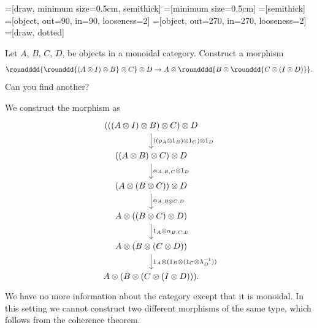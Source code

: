 \def\pathToRoot{../../}

\usetikzlibrary{fit}
\usetikzlibrary{knots}
\usetikzlibrary{hobby}
=[draw, minimum size=0.5cm, semithick]
=[minimum size=0.5cm]
=[semithick]
=[object, out=90, in=90, looseness=2]
=[object, out=270, in=270, looseness=2]
=[draw, dotted]

\graphicspath{{graphics/}}



\author{Felix Rech}


\begin{exercise}
  Let $A$, $B$, $C$, $D$, be objects in a monoidal category.
  Construct a morphism
  \[
    \roundddd{\rounddd{(A \otimes I) \otimes B} \otimes C} \otimes D
    \to A \otimes \roundddd{B \otimes \rounddd{C \otimes (I \otimes D)}}.
  \]
  Can you find another?
\end{exercise}

\begin{answer}
  We construct the morphism as
  \[ \begin{tikzcd}
    (((A \otimes I) \otimes B) \otimes C) \otimes D
      \arrow[d, "((\rho_A \otimes 1_B) \otimes 1_C) \otimes 1_D"] \\
    ((A \otimes B) \otimes C) \otimes D
      \arrow[d, "\alpha_{A, B, C} \otimes 1_D"] \\
    (A \otimes (B \otimes C)) \otimes D
      \arrow[d, "\alpha_{A, B \otimes C, D}"] \\
    A \otimes ((B \otimes C) \otimes D)
      \arrow[d, "1_A \otimes \alpha_{B, C, D}"] \\
    A \otimes (B \otimes (C \otimes D))
      \arrow[d, "1_A \otimes (1_B \otimes (1_C \otimes \lambda_D^{-1}))"] \\
    A \otimes (B \otimes (C \otimes (I \otimes D))).
  \end{tikzcd} \]
  We have no more information about the category except that it is monoidal.
  In this setting we cannot construct two different morphisms of the same type, which follows from the coherence theorem.
\end{answer}


